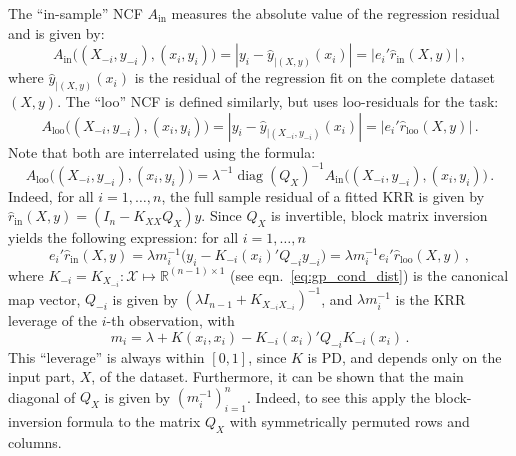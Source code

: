 \documentclass[a4paper]{article}
\newcommand{\Xcal}{\mathcal{X}}
\newcommand{\Real}{\mathbb{R}}
\newcommand{\diag}{\mathop{\text{diag}}\nolimits}
\begin{document}
The ``in-sample'' NCF $A_{\text{in}}$ measures the absolute value of the regression
residual and is given by:
\begin{equation} \label{eq:ins_ncf}
  A_{\text{in}}\bigl((X_{-i}, y_{-i}), (x_i, y_i)\bigr)
    = |y_i - \hat{y}_{|(X, y)}(x_i)| = |e_i' \hat{r}_{\text{in}}(X, y)|
    \,,
\end{equation}
where $\hat{y}_{|(X, y)}(x_i)$ is the residual of the regression fit on the complete
dataset $(X, y)$. The ``loo'' NCF is defined similarly, but uses loo-residuals for
the task:
\begin{equation*}
  A_{\text{loo}}\bigl((X_{-i}, y_{-i}), (x_i, y_i)\bigr)
    = |y_i - \hat{y}_{|(X_{-i}, y_{-i})}(x_i)| = |e_i' \hat{r}_{\text{loo}}(X, y)|
    \,.
\end{equation*}
Note that both are interrelated using the formula:
\begin{equation*}
  A_{\text{loo}}\bigl((X_{-i}, y_{-i}), (x_i, y_i)\bigr)
    = \lambda^{-1} \diag(Q_X)^{-1}
    A_{\text{in}}\bigl((X_{-i}, y_{-i}), (x_i, y_i)\bigr)
    \,.
\end{equation*}
Indeed, for all $i=1,\ldots,n$, the full sample residual of a fitted KRR is given
by $\hat{r}_{\text{in}}(X, y) = (I_n - K_{XX} Q_X) y$. Since $Q_X$ is invertible,
block matrix inversion yields the following expression: for all $i=1,\ldots, n$
\begin{equation} \label{eq:loo_resid}
  e_i' \hat{r}_{\text{in}}(X, y)
  = \lambda m_i^{-1} \bigl(y_i - K_{-i}(x_i)' Q_{-i} y_{-i} \bigr)
  = \lambda m_i^{-1} e_i' \hat{r}_{\text{loo}}(X, y) \,,
\end{equation}
where $K_{-i} = K_{X_{-i}}: \Xcal \mapsto \Real^{(n-1)\times1}$ (see eqn.~\ref{eq:gp_cond_dist})
is the canonical map vector, $Q_{-i}$ is given by $(\lambda I_{n-1} + K_{X_{-i}X_{-i}})^{-1}$,
and $\lambda m_i^{-1}$ is the KRR leverage of the $i$-th observation, with
\begin{equation*}
  m_i = \lambda + K(x_i, x_i) - K_{-i}(x_i)' Q_{-i} K_{-i}(x_i) \,.
\end{equation*}
This ``leverage'' is always within $[0,1]$, since $K$ is PD, and depends only on
the input part, $X$, of the dataset. Furthermore, it can be shown that the main
diagonal of $Q_X$ is given by $(m_i^{-1})_{i=1}^n$. Indeed, to see this apply the
block-inversion formula to the matrix $Q_X$ with symmetrically permuted rows and
columns.
\end{document}

